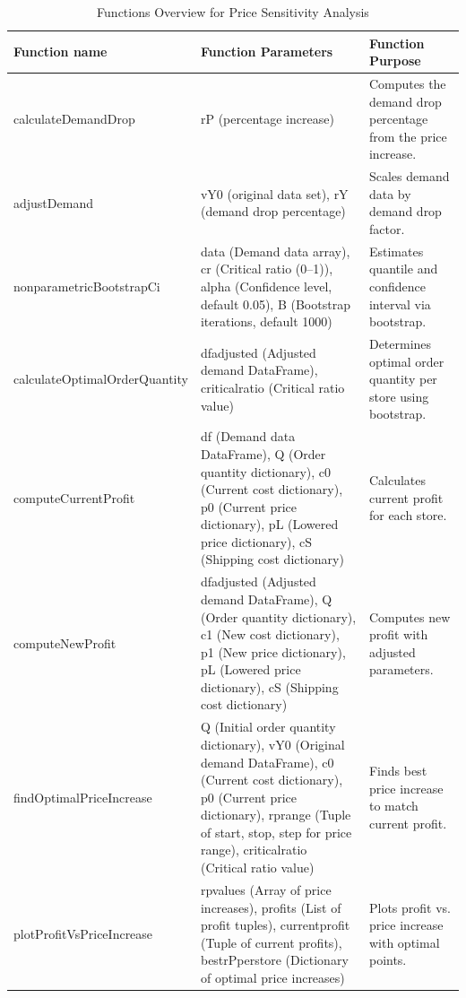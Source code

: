 \renewcommand{\arraystretch}{1.4}
\begin{table}[H]
\begin{tabular}{|>{\columncolor{blue!20}}p{6cm}|p{5cm}|p{5cm}|}
    \hline
    \rowcolor{black!10}\textbf{Function name} & \textbf{Function Parameters} & \textbf{Function Purpose}  \\ \hline
    calculateDemandDrop & rP (percentage increase) & Computes the demand drop percentage from the price increase. \\ \hline
    adjustDemand & vY0 (original data set), rY (demand drop percentage) & Scales demand data by demand drop factor. \\ \hline
    nonparametricBootstrapCi & data (Demand data array), cr (Critical ratio (0–1)), alpha (Confidence level, default 0.05), B (Bootstrap iterations, default 1000) & Estimates quantile and confidence interval via bootstrap. \\ \hline
    calculateOptimalOrderQuantity & dfadjusted (Adjusted demand DataFrame), criticalratio (Critical ratio value) & Determines optimal order quantity per store using bootstrap. \\ \hline
    computeCurrentProfit & df (Demand data DataFrame), Q (Order quantity dictionary), c0 (Current cost dictionary), p0 (Current price dictionary), pL (Lowered price dictionary), cS (Shipping cost dictionary) & Calculates current profit for each store. \\ \hline
    computeNewProfit & dfadjusted (Adjusted demand DataFrame), Q (Order quantity dictionary), c1 (New cost dictionary), p1 (New price dictionary), pL (Lowered price dictionary), cS (Shipping cost dictionary) & Computes new profit with adjusted parameters. \\ \hline
    findOptimalPriceIncrease & Q (Initial order quantity dictionary), vY0 (Original demand DataFrame), c0 (Current cost dictionary), p0 (Current price dictionary), rprange (Tuple of start, stop, step for price range), criticalratio (Critical ratio value) & Finds best price increase to match current profit. \\ \hline
    plotProfitVsPriceIncrease & rpvalues (Array of price increases), profits (List of profit tuples), currentprofit (Tuple of current profits), bestrPperstore (Dictionary of optimal price increases) & Plots profit vs. price increase with optimal points. \\ \hline
\end{tabular}
\caption{Functions Overview for Price Sensitivity Analysis}
\label{tab:functions}
\end{table}

